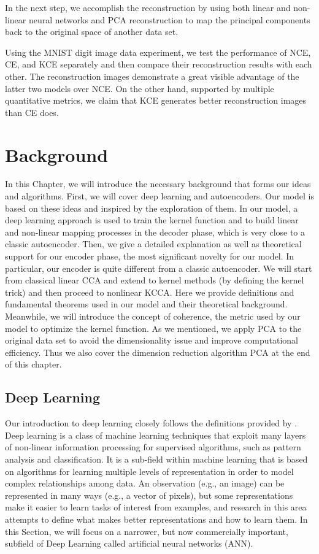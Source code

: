 \documentclass[12pt]{report} %
\begin{document}
In the next step, we accomplish the reconstruction by using both linear and non-linear neural networks and PCA reconstruction to map the principal components back to the original space of another data set. 

Using the MNIST digit image data experiment, we test the performance of NCE, CE, and KCE separately and then compare their reconstruction results with each other. The reconstruction images demonstrate a great visible advantage of the latter two models over NCE. On the other hand, supported by multiple quantitative metrics, we claim that KCE generates better reconstruction images than CE does. 

\chapter{Background}
In this Chapter, we will introduce the necessary background that forms our ideas and algorithms. First, we will cover deep learning and autoencoders. Our model is based on these ideas and inspired by the exploration of them. In our model, a deep learning approach is used to train the kernel function and to build linear and non-linear mapping processes in the decoder phase, which is very close to a classic autoencoder. 
Then, we give a detailed explanation as well as theoretical support for our encoder phase, the most significant novelty for our model. In particular, our encoder is quite different from a classic autoencoder. We will start from classical linear CCA and extend to kernel methods (by defining the kernel trick) and then proceed to nonlinear KCCA. Here we provide definitions and fundamental theorems used in our model and their theoretical background. Meanwhile, we will introduce the concept of coherence, the metric used by our model to optimize the kernel function. 
As we mentioned, we apply PCA to the original data set to avoid the dimensionality issue and improve computational efficiency. Thus we also cover the dimension reduction algorithm PCA at the end of this chapter. 

\section{Deep Learning}
Our introduction to deep learning closely follows the definitions provided by \cite{DL}. Deep learning is a class of machine learning techniques that exploit many layers of non-linear information processing for supervised algorithms, such as pattern analysis and classification. It is a sub-field within machine learning that is based on algorithms for learning multiple levels of representation in order to model complex relationships among data. An observation (e.g., an image) can be represented in many ways (e.g., a vector of pixels), but some representations make it easier to learn tasks of interest from examples, and research in this area attempts to define what makes better representations and how to learn them\cite{DL}. In this Section, we will focus on a narrower, but now commercially important, subfield of Deep Learning called artificial neural networks (ANN).
\end{document}
